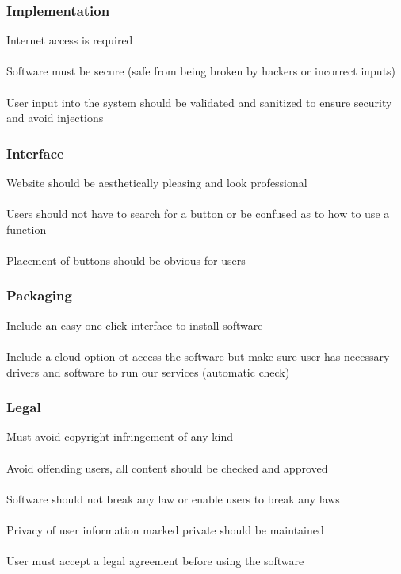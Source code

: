 \documentclass[11pt]{article}
\begin{document}
        \subsubsection{Implementation}
            Internet access is required \\
            \\
            Software must be secure (safe from being broken by hackers or
            incorrect inputs)\\
            \\
            User input into the system should be validated and sanitized to
            ensure security and avoid injections

        \subsubsection{Interface}
            Website should be aesthetically pleasing and look professional\\
            \\
            Users should not have to search for a button or be confused as to
            how to use a function\\
            \\
            Placement of buttons should be obvious for users

        \subsubsection{Packaging}
            Include an easy one-click interface to install software\\
            \\
            Include a cloud option ot access the software but make sure user has
            necessary drivers and software to run our services (automatic check)

        \subsubsection{Legal}
            Must avoid copyright infringement of any kind\\
            \\
            Avoid offending users, all content should be checked and approved\\
            \\
            Software should not break any law or enable users to break any
            laws\\
            \\
            Privacy of user information marked private should be maintained\\
            \\
            User must accept a legal agreement before using the software
    
\end{document}
